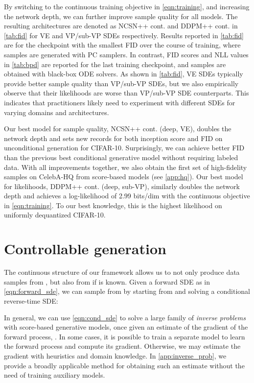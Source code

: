 \documentclass{article} \usepackage{iclr2021_conference,times}
\begin{document}
By switching to the continuous training objective in \cref{eqn:training}, and increasing the network depth, we can further improve sample quality for all models. The resulting architectures are denoted as NCSN++ cont. and DDPM++ cont. in \cref{tab:fid} for VE and VP/sub-VP SDEs respectively. Results reported in \cref{tab:fid} are for the checkpoint with the smallest FID over the course of training, where samples are generated with PC samplers. In contrast, FID scores and NLL values in \cref{tab:bpd} are reported for the last training checkpoint, and samples are obtained with black-box ODE solvers. As shown in \cref{tab:fid}, VE SDEs typically provide better sample quality than VP/sub-VP SDEs, but we also empirically observe that their likelihoods are worse than VP/sub-VP SDE counterparts. This indicates that practitioners likely need to experiment with different SDEs for varying domains and architectures.

Our best model for sample quality, NCSN++ cont. (deep, VE), doubles the network depth and sets new records for both inception score and FID on unconditional generation for CIFAR-10. Surprisingly, we can achieve better FID than the previous best conditional generative model without requiring labeled data. With all improvements together, we also obtain the first set of high-fidelity samples on CelebA-HQ  from score-based models (see \cref{app:hq}). Our best model for likelihoods, DDPM++ cont. (deep, sub-VP), similarly doubles the network depth and achieves a log-likelihood of 2.99 bits/dim with the continuous objective in \cref{eqn:training}. To our best knowledge, this is the highest likelihood on uniformly dequantized CIFAR-10.

 \section{Controllable generation}
The continuous structure of our framework allows us to not only produce data samples from , but also from  if  is known. Given a forward SDE as in \cref{eqn:forward_sde}, we can sample from  by starting from  and solving a conditional reverse-time SDE:

In general, we can use \cref{eqn:cond_sde} to solve a large family of \emph{inverse problems} with score-based generative models, once given an estimate of the gradient of the forward process, . In some cases, it is possible to train a separate model to learn the forward process  and compute its gradient. Otherwise, we may estimate the gradient with heuristics and domain knowledge. In \cref{app:inverse_prob}, we provide a broadly applicable method for obtaining such an estimate without the need of training auxiliary models.
\end{document}
